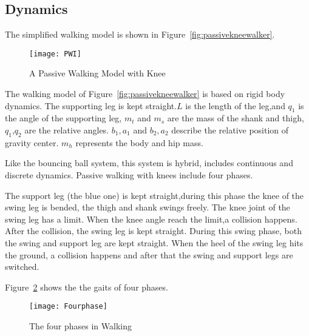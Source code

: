 \subsection*{Dynamics}

The simplified walking model is shown in Figure~\ref{fig:passivekneewalker}.

\begin{figure}[!htbp]
  \begin{center}
    \texttt{[image: PWI]}
    \caption{A Passive Walking Model with Knee}
    \label{fig:}
  \end{center}
\end{figure}
The walking model of Figure~\ref{fig:passivekneewalker} is based on rigid body dynamics.
The supporting leg is kept straight.$L$ is the length of the leg,and $q_1$ is the angle of the supporting leg,
$m_t$ and $m_s$ are the mass of the shank and thigh,
$q_1$,$q_2$ are the relative angles.
$b_1,a_1$ and $b_2,a_2$ describe the relative position of gravity center.
$m_h$ represents the body and hip mass.






Like the bouncing ball system, this system is hybrid\citep{ames2006categorical}, includes continuous and discrete dynamics.
Passive walking with knees include four phases\citep{Chen2007}.
\begin{itemize}
The support leg (the blue one) is kept straight,during this phase the knee of the swing leg is bended, the thigh and shank swings freely.
The knee joint of the swing leg has a limit.
When the knee angle reach the limit,a collision happens.
After the collision, the swing leg is kept straight.
During this swing phase, both the swing and support leg are kept straight.
When the heel of the swing leg hits the ground, a collision happens and after that the swing and support legs are switched.
\end{itemize}

Figure~\ref{fig:fwalkingphase} shows the the gaits of four phases.
\begin{figure}[!htbp]
  \begin{center}
      \texttt{[image: Fourphase]}
    \caption{The four phases in Walking}
    \label{fig:fwalkingphase}
\end{center}
\end{figure}





